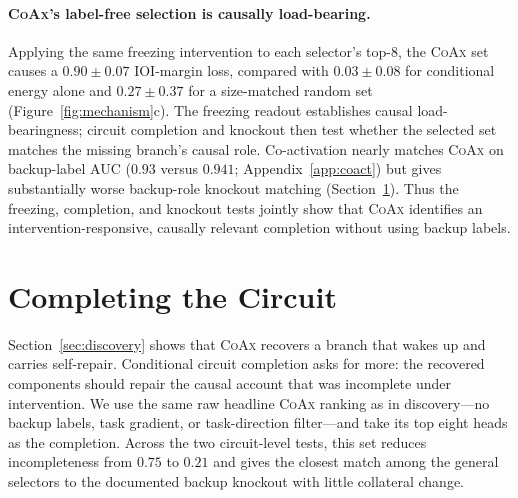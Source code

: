 \documentclass{article} %
\theoremstyle{plain}
\theoremstyle{definition}
\newcommand{\coax}{\textsc{CoAx}\xspace}
\begin{document}
\paragraph{\coax's label-free selection is causally load-bearing.}
Applying the same freezing intervention to each selector's top-$8$, the \coax set causes a $0.90{\pm}0.07$ IOI-margin loss, compared with $0.03{\pm}0.08$ for conditional energy alone and $0.27{\pm}0.37$ for a size-matched random set (Figure~\ref{fig:mechanism}c).
The freezing readout establishes causal load-bearingness; circuit completion and knockout then test whether the selected set matches the missing branch's causal role. Co-activation nearly matches \coax on backup-label AUC ($0.93$ versus $0.941$; Appendix~\ref{app:coact}) but gives substantially worse backup-role knockout matching (Section~\ref{sec:apps}).
Thus the freezing, completion, and knockout tests jointly show that \coax identifies an intervention-responsive, causally relevant completion without using backup labels.


\FloatBarrier
\section{Completing the Circuit}
\label{sec:apps}

Section~\ref{sec:discovery} shows that \coax recovers a branch that wakes up and carries self-repair.
Conditional circuit completion asks for more: the recovered components should repair the causal account that was incomplete under intervention.
We use the same raw headline \coax ranking as in discovery---no backup labels, task gradient, or task-direction filter---and take its top eight heads as the completion.
Across the two circuit-level tests, this set reduces incompleteness from $0.75$ to $0.21$ and gives the closest match among the general selectors to the documented backup knockout with little collateral change.
\end{document}
